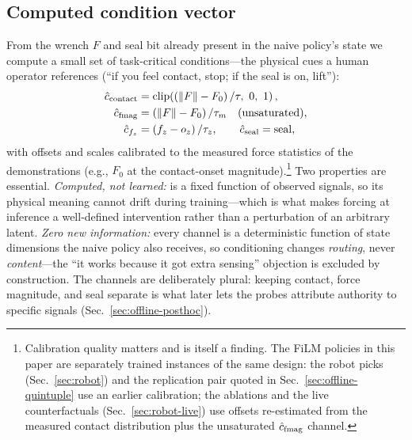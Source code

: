 \subsection{Computed condition vector \chat{}}
\label{sec:method-chat}
From the wrench $F$ and seal bit already present in the naive policy's state we compute a small
set of task-critical conditions---the physical cues a human operator references (``if you feel
contact, stop; if the seal is on, lift''):
\begin{align}
\hat{c}_{\mathrm{contact}} &= \mathrm{clip}\!\left(\left(\lVert F\rVert - F_0\right)/\tau,\ 0,\ 1\right),\nonumber\\
\hat{c}_{\mathrm{fmag}} &= \left(\lVert F\rVert - F_0\right)/\tau_m \quad\text{(unsaturated)},\nonumber\\
\hat{c}_{f_z} &= \left(f_z - o_z\right)/\tau_z,\qquad
\hat{c}_{\mathrm{seal}} = \mathrm{seal},
\label{eq:chat}
\end{align}
with offsets and scales calibrated to the measured force statistics of the demonstrations (e.g.,
$F_0$ at the contact-onset magnitude).\footnote{Calibration quality matters and is itself a
finding. The FiLM policies in this paper are separately trained instances of the same
design: the robot picks (Sec.~\ref{sec:robot}) and the replication pair quoted in
Sec.~\ref{sec:offline-quintuple} use an earlier calibration; the ablations and the live
counterfactuals (Sec.~\ref{sec:robot-live}) use offsets re-estimated from the measured contact
distribution plus the unsaturated $\hat{c}_{\mathrm{fmag}}$ channel.} Two properties are essential. \emph{Computed, not
learned:} \chat{} is a fixed function of observed signals, so its physical meaning cannot drift
during training---which is what makes forcing \chat{} at inference a well-defined intervention
rather than a perturbation of an arbitrary latent. \emph{Zero new information:} every channel is a deterministic
function of state dimensions the naive policy also receives, so conditioning changes
\emph{routing}, never \emph{content}---the ``it works because it got extra sensing'' objection is
excluded by construction. The channels are deliberately plural: keeping contact, force magnitude,
and seal separate is what later lets the probes attribute authority to specific signals
(Sec.~\ref{sec:offline-posthoc}).

